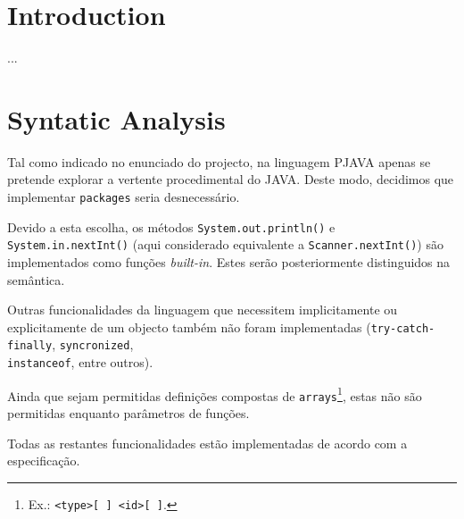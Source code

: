\documentclass[a4paper]{article}
\title{\documentTitle}
\author{\documentAuthors{}}
\begin{document}
\renewcommand{\figurename}{Figure}
\renewcommand{\contentsname}{Contents}

\maketitle
\cleardoublepage

\tableofcontents
\cleardoublepage

\setlength{\parindent}{1cm}
\setlength{\parskip}{0.3cm}

\section{Introduction}
\indent \indent ...

\cleardoublepage

\section{Syntatic Analysis}
\indent \indent Tal como indicado no enunciado do projecto, na linguagem PJAVA apenas se pretende explorar a vertente procedimental do JAVA. 
Deste modo, decidimos que implementar \texttt{packages} seria desnecessário.

\indent Devido a esta escolha, os métodos \texttt{System.out.println()} e \texttt{System.in.nextInt()} (aqui considerado equivalente a \texttt{Scanner.nextInt()})
são implementados como funções \emph{built-in}. Estes serão posteriormente distinguidos na semântica.

Outras funcionalidades da linguagem que necessitem implicitamente ou explicitamente de um objecto também não foram implementadas (\texttt{try-catch-finally}, \texttt{syncronized}, \\ \texttt{instanceof}, entre outros).

Ainda que sejam permitidas definições compostas de \texttt{arrays}\footnote[1]{Ex.: \texttt{<type>[ ] <id>[ ]}.}, estas não são permitidas enquanto parâmetros de funções.

Todas as restantes funcionalidades estão implementadas de acordo com a especificação.

\cleardoublepage
\end{document}
